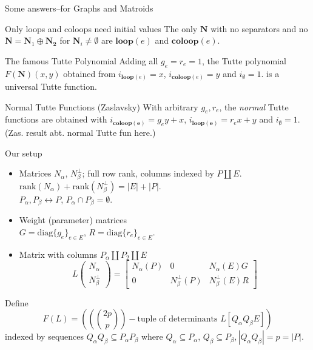 \documentclass{beamer}
\newcommand{\dunion}{\coprod}
\newcommand{\ext}[1]{\ensuremath{\mathbf{#1}}}
\begin{document}
\begin{frame}{Some answers--for Graphs and Matroids}

  \begin{block}{Only loops and coloops need initial values}
    The only
    $\ext{N}$ with no separators and no $\ext{N}=\ext{N}_1\oplus\ext{N_2}$
    for $\ext{N}_i\neq\emptyset$ are $\mathbf{loop}(e)$
    and $\mathbf{coloop}(e)$.
  \end{block}


  \begin{block}{The famous Tutte Polynomial}
  Adding all $g_e=r_e=1$, the Tutte polynomial $F(\ext{N})(x,y)$
  obtained from $i_{\mathbf{loop}(e)}=x$, 
  $i_{\mathbf{coloop}(e)}=y$ and $i_{\mathbf{\emptyset}}=1$.
  is a universal Tutte function.
  \end{block}
  
  \begin{block}{Normal Tutte Functions}
    (Zaslavsky) With arbitrary $g_e,r_e$, the \emph{normal} Tutte functions are
  obtained with $i_{\mathbf{coloop(e)}}=g_ey + x$,
  $i_{\mathbf{loop(e)}}=r_ex + y$ and  $i_{\mathbf{\emptyset}}=1$.
  (Zas. result abt. normal Tutte fun here.)
  \end{block}

\end{frame}

      
\newcommand{\Nal}{\ensuremath{N_{\alpha}}}
\newcommand{\NbePe}{\ensuremath{N_{\beta}^{\perp}}}
\newcommand{\eNal}{\ensuremath{\ext{N}_{\alpha}}}
\newcommand{\eNbePe}{\ensuremath{\ext{N}_{\beta}^{\perp}}}


\begin{frame}{Our setup}
  \begin{itemize}
  \item
    Matrices $\Nal$, $\NbePe$; full row rank, columns indexed by
    $P\dunion E$. $\text{rank}(\Nal)+\text{rank}(\NbePe)=|E|+|P|$.\\
    $P_{\alpha},P_{\beta}\leftrightarrow P$, $P_{\alpha}\cap P_{\beta}=\emptyset$.
  \item
    Weight (parameter) matrices\\
    $G=\text{diag}\{g_e\}_{e\in E} $,
    $R=\text{diag}\{r_e\}_{e\in E} $.
  \item
    Matrix with columns $P_\alpha \dunion P_2 \dunion E$
    \[
    L\left( \begin{array}{c} \Nal\\ \NbePe \end{array} \right)
    = \left[\begin{array}{c|c|c} \Nal(P)  &  0  &  \Nal(E)G \\  \hline
0  & \NbePe(P)  &  \NbePe(E)R \end{array}\right]
    \]
  \end{itemize}

  Define
  \[
  F(L)=((\binom{2p}{p})-\text{tuple of determinants\ } L[Q_\alpha Q_\beta E])
  \]
  indexed by sequences $Q_\alpha Q_\beta \subseteq P_\alpha P_\beta$ where
  $Q_\alpha\subseteq P_\alpha$, $Q_\beta\subseteq P_\beta, |Q_\alpha Q_\beta|=p=|P|$.
    
\end{frame}
\end{document}
